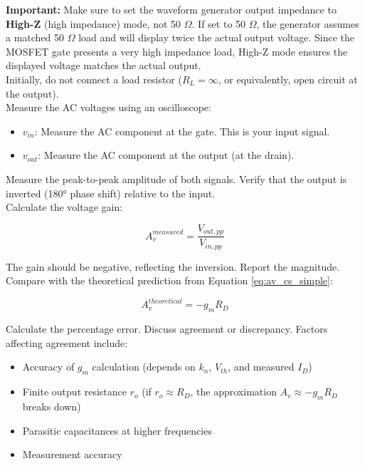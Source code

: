 \documentclass[10pt]{article}
\begin{document}
\textbf{Important:} Make sure to set the waveform generator output impedance to \textbf{High-Z} (high impedance) mode, not 50 $\Omega$. If set to 50 $\Omega$, the generator assumes a matched 50 $\Omega$ load and will display twice the actual output voltage. Since the MOSFET gate presents a very high impedance load, High-Z mode ensures the displayed voltage matches the actual output.\\

Initially, do not connect a load resistor ($R_L = \infty$, or equivalently, open circuit at the output).\\

Measure the AC voltages using an oscilloscope: 

\begin{itemize}
    \item $v_{in}$: Measure the AC component at the gate. This is your input signal.
    \item $v_{out}$: Measure the AC component at the output (at the drain).
\end{itemize}
    
Measure the peak-to-peak amplitude of both signals.  Verify that the output is inverted (180° phase shift) relative to the input. \\

Calculate the voltage gain:

\begin{equation}
    A_v^{measured} = \frac{V_{out, pp}}{V_{in, pp}}
\end{equation}

The gain should be negative, reflecting the inversion.  Report the magnitude. \\

Compare with the theoretical prediction from Equation \ref{eq:av_cs_simple}:

\begin{equation}
    A_v^{theoretical} = -g_m R_D
\end{equation}

Calculate the percentage error.  Discuss agreement or discrepancy.  Factors affecting agreement include:

\begin{itemize}
    \item Accuracy of $g_m$ calculation (depends on $k_n$, $V_{th}$, and measured $I_D$)
    \item Finite output resistance $r_o$ (if $r_o \approx R_D$, the approximation $A_v \approx -g_m R_D$ breaks down)
    \item Parasitic capacitances at higher frequencies
    \item Measurement accuracy
\end{itemize}
\end{document}

